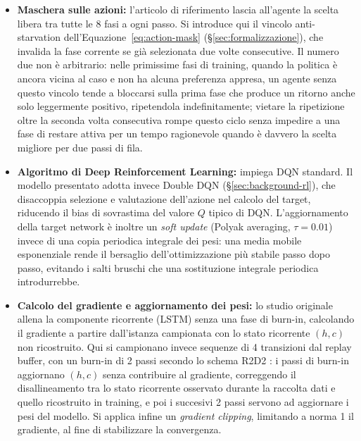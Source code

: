 \begin{itemize}
  \item \textbf{Maschera sulle azioni:} l'articolo di riferimento lascia all'agente la scelta libera tra tutte le 8 fasi a ogni passo. Si introduce qui il vincolo anti-starvation dell'Equazione~\ref{eq:action-mask} (§\ref{sec:formalizzazione}), che invalida la fase corrente se già selezionata due volte consecutive. Il numero due non è arbitrario: nelle primissime fasi di training, quando la politica è ancora vicina al caso e non ha alcuna preferenza appresa, un agente senza questo vincolo tende a bloccarsi sulla prima fase che produce un ritorno anche solo leggermente positivo, ripetendola indefinitamente; vietare la ripetizione oltre la seconda volta consecutiva rompe questo ciclo senza impedire a una fase di restare attiva per un tempo ragionevole quando è davvero la scelta migliore per due passi di fila.

  \item \textbf{Algoritmo di Deep Reinforcement Learning:} \citet{wang2022metastgat} impiega DQN standard. Il modello presentato adotta invece Double DQN \citep{vanhasselt2016double} (§\ref{sec:background-rl}), che disaccoppia selezione e valutazione dell'azione nel calcolo del target, riducendo il bias di sovrastima del valore $Q$ tipico di DQN. L'aggiornamento della target network è inoltre un \emph{soft update} (Polyak averaging, $\tau=0.01$) invece di una copia periodica integrale dei pesi: una media mobile esponenziale rende il bersaglio dell'ottimizzazione più stabile passo dopo passo, evitando i salti bruschi che una sostituzione integrale periodica introdurrebbe.

  \item \textbf{Calcolo del gradiente e aggiornamento dei pesi:} lo studio originale allena la componente ricorrente (LSTM) senza una fase di burn-in, calcolando il gradiente a partire dall'istanza campionata con lo stato ricorrente $(h,c)$ non ricostruito. Qui si campionano invece sequenze di 4 transizioni dal replay buffer, con un burn-in di 2 passi secondo lo schema R2D2 \citep{kapturowski2019r2d2}: i passi di burn-in aggiornano $(h,c)$ senza contribuire al gradiente, correggendo il disallineamento tra lo stato ricorrente osservato durante la raccolta dati e quello ricostruito in training, e poi i succesivi 2 passi servono ad aggiornare i pesi del modello. Si applica infine un \emph{gradient clipping}, limitando a norma 1 il gradiente, al fine di stabilizzare la convergenza.


\end{itemize}
